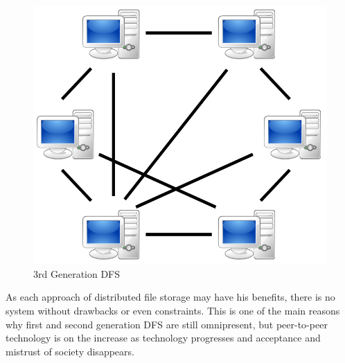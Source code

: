 	\begin{figure}[H]
		\begin{center}
		\includegraphics[scale=0.25]{Talk5/3rd_gen_dfs.PNG}
		\end{center}
		\caption{3rd Generation DFS \cite{wikimedia:p2p}}
		\label{3rd_gen_dfs}
	\end{figure}
As each approach of distributed file storage may have his benefits, there is no system without drawbacks or even constraints. This is one of the main reasons why first and second generation DFS are still omnipresent, but peer-to-peer technology is on the increase as technology progresses and acceptance and mistrust of society disappears.

